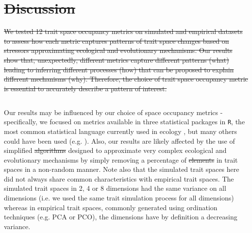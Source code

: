 \documentclass[12pt,letterpaper]{article}
\providecommand{\DIFaddtex}[1]{{\protect\color{blue}\uwave{#1}}} %
\providecommand{\DIFdeltex}[1]{{\protect\color{red}\sout{#1}}}                      %
\providecommand{\DIFaddbegin}{} %
\providecommand{\DIFaddend}{} %
\providecommand{\DIFdelbegin}{} %
\providecommand{\DIFdelend}{} %
\providecommand{\DIFadd}[1]{\texorpdfstring{\DIFaddtex{#1}}{#1}} %
\providecommand{\DIFdel}[1]{\texorpdfstring{\DIFdeltex{#1}}{}} %
\newcommand{\DIFscaledelfig}{0.5}
\newlength{\DIFdelgraphicswidth} %
\newlength{\DIFdelgraphicsheight} %
\newcommand{\DIFaddincludegraphics}[2][]{{\color{blue}\fbox{\DIFOincludegraphics[#1]{#2}}}} %
\newcommand{\DIFdelincludegraphics}[2][]{%
\sbox{\DIFdelgraphicsbox}{\DIFOincludegraphics[#1]{#2}}%
\settoboxwidth{\DIFdelgraphicswidth}{\DIFdelgraphicsbox} %
\settoboxtotalheight{\DIFdelgraphicsheight}{\DIFdelgraphicsbox} %
\scalebox{\DIFscaledelfig}{%
\parbox[b]{\DIFdelgraphicswidth}{\usebox{\DIFdelgraphicsbox}\\[-\baselineskip] \rule{\DIFdelgraphicswidth}{0em}}\llap{\resizebox{\DIFdelgraphicswidth}{\DIFdelgraphicsheight}{%
\setlength{\unitlength}{\DIFdelgraphicswidth}%
\begin{picture}(1,1)%
\thicklines\linethickness{2pt} %
{\color[rgb]{1,0,0}\put(0,0){\framebox(1,1){}}}%
{\color[rgb]{1,0,0}\put(0,0){\line( 1,1){1}}}%
{\color[rgb]{1,0,0}\put(0,1){\line(1,-1){1}}}%
\end{picture}%
}\hspace*{3pt}}} %
} %
\DeclareRobustCommand{\DIFaddbegin}{\DIFOaddbegin \let\includegraphics\DIFaddincludegraphics} %
\DeclareRobustCommand{\DIFaddend}{\DIFOaddend \let\includegraphics\DIFOincludegraphics} %
\DeclareRobustCommand{\DIFdelbegin}{\DIFOdelbegin \let\includegraphics\DIFdelincludegraphics} %
\DeclareRobustCommand{\DIFdelend}{\DIFOaddend \let\includegraphics\DIFOincludegraphics} %
\begin{document}
\DIFdelbegin \section{\DIFdel{Discussion}}
\addtocounter{section}{-1}%

\DIFdel{We tested 12 trait space occupancy metrics on simulated and empirical datasets to assess how each metric captures patterns of trait space changes based on stressors approximating ecological and evolutionary mechanisms.
Our results show that, unexpectedly, different metrics capture different patterns (what) leading to inferring different processes (how) that can be proposed to explain different mechanisms (why).
Therefore, the choice of trait space occupancy metric is essential to accurately describe a pattern of interest.
}\DIFdelend \DIFaddbegin \subsection{\DIFadd{Caveats}}
\DIFaddend 

Our results may be influenced by our choice of space occupancy metrics - specifically, we focused on metrics available in three statistical packages in \texttt{R}, the most common statistical language currently used in ecology \citep{lai2019evaluating}, but many others could have been used (e.g. \citealt{guillerme2020shifting}).
Also, our results are likely affected by the use of simplified \DIFdelbegin \DIFdel{algorithms }\DIFdelend \DIFaddbegin \DIFadd{stressors }\DIFaddend designed to approximate very complex ecological and evolutionary mechanisms by simply removing a percentage of \DIFdelbegin \DIFdel{elements }\DIFdelend \DIFaddbegin \DIFadd{observations }\DIFaddend in trait spaces in a non-random manner.
Note also that the simulated trait spaces here did not always share common characteristics with empirical trait spaces.
The simulated trait spaces in 2, 4 or 8 dimensions had the same variance on all dimensions (i.e. we used the same trait simulation process for all dimensions) whereas in empirical trait spaces, commonly generated using ordination techniques (e.g. PCA or PCO), the dimensions have by definition a decreasing variance.
\end{document}
